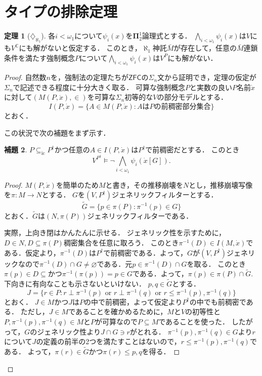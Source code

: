 \documentclass[uplatex]{jsarticle}
\newcommand{\C}{\mathbb{C}}
\newcommand{\boldpi}{\boldsymbol{\Pi}}
\newcommand{\ZFC}{\mathsf{ZFC}}
\newcommand{\subsetic}{\subseteq_{\mathrm{ic}}}
\renewcommand\emptyset{\varnothing}
\renewcommand\subset{\subseteq}
\theoremstyle{definition}
\newtheorem{thm}{定理}[section]
\newtheorem{lem}[thm]{補題}
\begin{document}
	\section{タイプの排除定理}
	
	\begin{thm}[$\diamondsuit_{\aleph_1}$]
		各$i < \omega_1$について$\psi_i(x)$を$\boldpi^1_2$論理式とする．
		$\bigwedge_{i < \omega_1} \psi_i(x)$は$V$にも$V^\C$にも解がないと仮定する．
		このとき，$\aleph_1$神託$\bar{M}$が存在して，任意の$\bar{M}$連鎖条件を満たす強制概念$P$について$\bigwedge_{i < \omega_1} \psi_i(x)$は$V^P$にも解がない．
	\end{thm}
	\begin{proof}
		自然数$n$を，強制法の定理たちが$\ZFC$の$\Sigma_n$文から証明でき，定理の仮定が$\Sigma_n$で記述できる程度に十分大きく取る．
		可算な強制概念$P$と実数の良い$P$名前$\dot{x}$に対して$(M(P, \dot{x}), \in)$を可算な$\Sigma_n$初等的な$V$の部分モデルとする．	
		\[
		I(P, \dot{x}) = \{ A \in M(P, \dot{x}) : \text{$A$は$P$の前稠密部分集合}  \}
		\]
		とおく．
		
		この状況で次の補題をまず示す．
		
		\begin{lem}\label{lem:typeomitting}
			$P \subsetic P^\dagger$かつ任意の$A \in I(P, \dot{x})$は$P^\dagger$で前稠密だとする．
			このとき
			\[
				V^{P^\dagger} \models \neg \bigwedge_{i < \omega_1} \psi_i(\dot{x}[G]).
			\]
		\end{lem}
		\renewcommand\qedsymbol{//}
		\begin{proof}
			$M(P, \dot{x})$を簡単のため$M$と書き，その推移崩壊を$N$とし，推移崩壊写像を$\pi \colon M \to N$とする．
			$G$を$(V, P^\dagger)$ジェネリックフィルターとする．
			\[
			\tilde{G} = \{ p \in \pi(P) : \pi^{-1}(p) \in G \}
			\]
			とおく．$\tilde{G}$は$(N, \pi(P))$ジェネリックフィルターである．
			
			実際，上向き閉はかんたんに示せる．
			ジェネリック性を示すために，$D \in N, D \subset \pi(P)$稠密集合を任意に取ろう．
			このとき$\pi^{-1}(D) \in I(M, \dot{x})$である．仮定より，$\pi^{-1}(D)$は$P^\dagger$で前稠密である．よって，$G$が$(V, P^\dagger)$ジェネリックなので$\pi^{-1}(D) \cap G \ne \emptyset$である．元$p \in \pi^{-1}(D) \cap G$を取る．
			このとき$\pi(p) \in D \subset$かつ$\pi^{-1}(\pi(p)) = p \in G$である．よって，$\pi(p) \in \pi(P) \cap \tilde{G}$.
			下向きに有向なことも示さないといけない．
			$p, q \in \tilde{G}$とする．
			\[ J = \{ r \in P : r \perp \pi^{-1}(p) \text{ or } r \perp \pi^{-1}(q) \text{ or } r \le \pi^{-1}(p), \pi^{-1}(q) \} \]
			とおく．
			$J \in M$かつ$J$は$P$の中で前稠密，よって仮定より$P^\dagger$の中でも前稠密である．
			ただし，$J \in M$であることを確かめるために，$M$と$V$の初等性と$P, \pi^{-1}(p), \pi^{-1}(q) \in M$と$P$が可算なので$P \subset M$であることを使った．
			したがって，$G$のジェネリック性より$J \cap G \ni r$がとれる．
			$\pi^{-1}(p), \pi^{-1}(q) \in G$より$r$について$J$の定義の前半の2つを満たすことはないので，$r \le \pi^{-1}(p), \pi^{-1}(q)$である．
			よって，$\pi(r) \in \tilde{G}$かつ$\pi(r) \le p, q$を得る．
			

\end{proof}
\end{proof}
\end{document}
